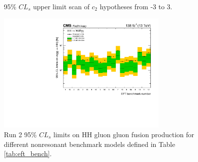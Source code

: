 \begin{figure}[!htbp]
  \setcounter{subfigure}{0}
  \centering
  \qquad
  \caption{95\% $CL_{s}$ upper limit scan of $c_{2}$ hypotheses from -3 to 3.}
  \label{fig:c2_scan}
\end{figure}

\begin{figure}[!htbp]
\centering
\includegraphics[width=0.75\textwidth]{Images/Results/EFT_CombinedUpperlimits.pdf}
\caption{Run 2 95\% $CL_{s}$ limits on HH gluon gluon fusion production for different nonresonant benchmark models defined in Table \ref{tab:eft_bench}.}
\label{fig:20_EFT_benchmark_results_all}
\end{figure}
